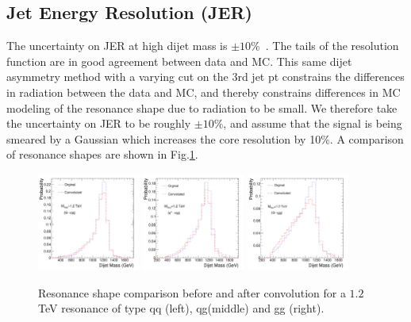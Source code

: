 \subsection{Jet Energy Resolution (JER)}

The uncertainty on JER at high dijet mass is $\pm10\%$~\cite{JME-10-014-PAS}.  
The tails of the resolution function are in good agreement between data and MC.
This same dijet asymmetry method with a varying cut on the 3rd jet pt constrains the differences in 
radiation between the data and MC, and thereby constrains differences in MC 
modeling of the resonance shape due to radiation to be small.
We therefore take the uncertainty on JER to be roughly $\pm10\%$, and assume that the signal is being smeared 
by a Gaussian which increases the core resolution by 10\%. A comparison of resonance shapes are shown in
Fig.\ref{conv_shape}.

\begin{figure}[!ht]
  \begin{center}
         \includegraphics[width=0.3\textwidth]{Figures/Resonace_Shape_Convoluted_qq_1200_2.pdf}
          \includegraphics[width=0.3\textwidth]{Figures/Resonace_Shape_Convoluted_qg_1200_2.pdf}
           \includegraphics[width=0.3\textwidth]{Figures/Resonace_Shape_Convoluted_gg_1200_2.pdf}
    \caption{Resonance shape comparison before and after convolution for a $1.2$ TeV resonance 
    of type qq (left), qg(middle) and gg (right).}
    \label{conv_shape}
  \end{center}
\end{figure} 

